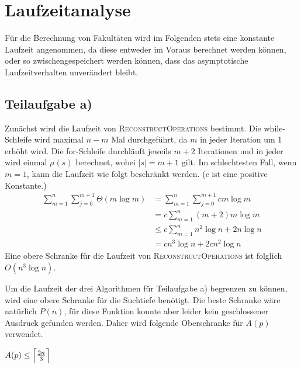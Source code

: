 \documentclass[a4paper, 10pt, ngerman]{article}
\begin{document}
\section{Laufzeitanalyse}

Für die Berechnung von Fakultäten wird im Folgenden stets eine konstante Laufzeit angenommen, da diese entweder im Voraus berechnet werden können, oder so zwischengespeichert werden können, dass das asymptotische Laufzeitverhalten unverändert bleibt.

\subsection{Teilaufgabe a)}

Zunächst wird die Laufzeit von \textsc{ReconstructOperations} bestimmt. Die while-Schleife wird maximal $n - m$ Mal durchgeführt, da $m$ in jeder Iteration um 1 erhöht wird. Die for-Schleife durchläuft jeweils $m + 2$ Iterationen und in jeder wird einmal $\mu(s)$ berechnet, wobei $|s| = m+1$ gilt. Im schlechtesten Fall, wenn $m = 1$, kann die Laufzeit wie folgt beschränkt werden. ($c$ ist eine positive Konstante.)
\begin{align*}
    \sum_{m = 1}^n \sum_{j = 0}^{m+1} \Theta(m \log m)
     & = \sum_{m = 1}^n \sum_{j = 0}^{m+1} cm \log m \\
     & = c \sum_{m = 1}^n (m + 2)m \log m            \\
     & \le c \sum_{m = 1}^n n^2 \log n  + 2 n \log n \\
     & = cn^3 \log n + 2cn^2 \log n                 
\end{align*}
Eine obere Schranke für die Laufzeit von \textsc{ReconstructOperations} ist folglich $O(n^3 \log n)$.

Um die Laufzeit der drei Algorithmen für Teilaufgabe a) begrenzen zu können, wird eine obere Schranke für die Suchtiefe benötigt. Die beste Schranke wäre natürlich $P(n)$, für diese Funktion konnte aber leider kein geschlossener Ausdruck gefunden werden. Daher wird folgende Oberschranke für $A(p)$ verwendet.

\begin{lemma}
    $A(p) \le \Big{\lceil} \frac {2n} 3 \Big{\rceil}$
\end{lemma}
\end{document}
